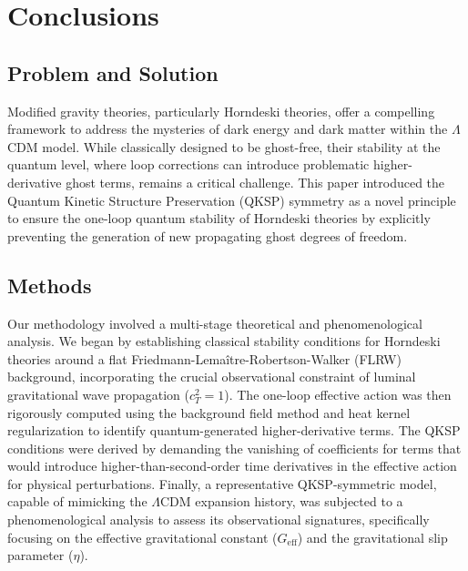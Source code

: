 \documentclass[twocolumn]{aastex631}
\begin{document}
\section{Conclusions}
\label{sec:conclusions}


\subsection{Problem and Solution}
Modified gravity theories, particularly Horndeski theories, offer a compelling framework to address the mysteries of dark energy and dark matter within the $\Lambda$CDM model. While classically designed to be ghost-free, their stability at the quantum level, where loop corrections can introduce problematic higher-derivative ghost terms, remains a critical challenge. This paper introduced the Quantum Kinetic Structure Preservation (QKSP) symmetry as a novel principle to ensure the one-loop quantum stability of Horndeski theories by explicitly preventing the generation of new propagating ghost degrees of freedom.

\subsection{Methods}
Our methodology involved a multi-stage theoretical and phenomenological analysis. We began by establishing classical stability conditions for Horndeski theories around a flat Friedmann-Lemaître-Robertson-Walker (FLRW) background, incorporating the crucial observational constraint of luminal gravitational wave propagation ($c_T^2=1$). The one-loop effective action was then rigorously computed using the background field method and heat kernel regularization to identify quantum-generated higher-derivative terms. The QKSP conditions were derived by demanding the vanishing of coefficients for terms that would introduce higher-than-second-order time derivatives in the effective action for physical perturbations. Finally, a representative QKSP-symmetric model, capable of mimicking the $\Lambda$CDM expansion history, was subjected to a phenomenological analysis to assess its observational signatures, specifically focusing on the effective gravitational constant ($G_{\text{eff}}$) and the gravitational slip parameter ($\eta$).
\end{document}
